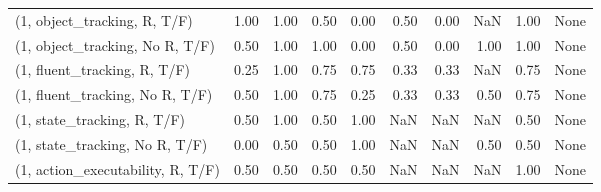 \begin{table*}[h!]
\begin{adjustbox}{width=2\columnwidth,center}
\begin{tabular}{lrrr|rrr|rrr}
\midrule
(1, object\_tracking, R, T/F)         &                      1.00 &                  1.00 &                      0.50 &                          0.00 &                      0.50 &                          0.00 &                                    NaN &                               1.00 &                                  None \\
(1, object\_tracking, No R, T/F)      &                      0.50 &                  1.00 &                      1.00 &                          0.00 &                      0.50 &                          0.00 &                                   1.00 &                               1.00 &                                  None \\
(1, fluent\_tracking, R, T/F)         &                      0.25 &                  1.00 &                      0.75 &                          0.75 &                      0.33 &                          0.33 &                                    NaN &                               0.75 &                                  None \\
(1, fluent\_tracking, No R, T/F)      &                      0.50 &                  1.00 &                      0.75 &                          0.25 &                      0.33 &                          0.33 &                                   0.50 &                               0.75 &                                  None \\
(1, state\_tracking, R, T/F)          &                      0.50 &                  1.00 &                      0.50 &                          1.00 &                       NaN &                           NaN &                                    NaN &                               0.50 &                                  None \\
(1, state\_tracking, No R, T/F)       &                      0.00 &                  0.50 &                      0.50 &                          1.00 &                       NaN &                           NaN &                                   0.50 &                               0.50 &                                  None \\
(1, action\_executability, R, T/F)    &                      0.50 &                  0.50 &                      0.50 &                          0.50 &                       NaN &                           NaN &                                    NaN &                               1.00 &                                  None \\

\end{tabular}
\end{adjustbox}
\end{table*}
